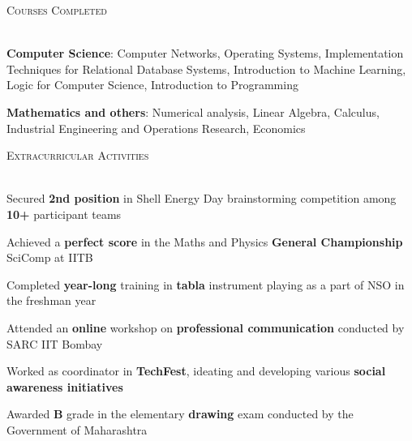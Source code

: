 \documentclass[12pt]{article}
\renewcommand{\section}[1]{
    \vspace*{10pt}
    \textsc{\Large{#1}}
    \vspace*{-10pt} \\ \hspace*{-5pt} 
    \hrulefill \\
    \vspace*{-15pt}
}
\newcommand{\smallbullet}{
    \small$\bullet$
}
\newenvironment{bullet-list-major}{
    \begin{list}{
        \smallbullet
    }{
        \setlength\leftmargin{15pt}\topsep 0pt \itemsep -4pt
    }
} {
    \end{list}
}
\begin{document}

    \section{Courses Completed}

    \begin{bullet-list-major}
        \item \textbf{Computer Science}: Computer Networks, Operating Systems, Implementation Techniques for
        Relational Database Systems, Introduction to Machine Learning, Logic for Computer Science, Introduction
        to Programming
        \item \textbf{Mathematics and others}: Numerical analysis, Linear Algebra, Calculus, Industrial Engineering
        and Operations Research, Economics
    \end{bullet-list-major}


    \section{Extracurricular Activities}

    \begin{bullet-list-major}
        \item Secured \textbf{2nd position} in Shell Energy Day brainstorming competition among \textbf{10+} participant teams
        \item Achieved a \textbf{perfect score} in the Maths and Physics \textbf{General Championship} SciComp at IITB
        \item Completed \textbf{year-long} training in \textbf{tabla} instrument playing as a part of NSO in the freshman year
        \item Attended an \textbf{online} workshop on \textbf{professional communication} conducted by SARC IIT Bombay
        \item Worked as coordinator in \textbf{TechFest}, ideating and developing various \textbf{social awareness initiatives}
        \item Awarded \textbf{B} grade in the elementary \textbf{drawing} exam conducted by the Government of Maharashtra
    \end{bullet-list-major}


    \vspace*{-7.71mm}
\end{document}
